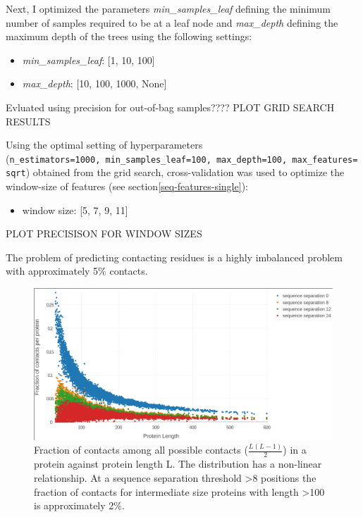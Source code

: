 \documentclass[12pt,a4paper,twoside]{book}
\providecommand{\tightlist}{%
  \setlength{\itemsep}{0pt}\setlength{\parskip}{0pt}}
\theoremstyle{definition}
\theoremstyle{definition}
\theoremstyle{remark}
\begin{document}
Next, I optimized the parameters \emph{min\_samples\_leaf} defining the
minimum number of samples required to be at a leaf node and
\emph{max\_depth} defining the maximum depth of the trees using the
following settings:

\begin{itemize}
\tightlist
\item
  \emph{min\_samples\_leaf}: {[}1, 10, 100{]}
\item
  \emph{max\_depth}: {[}10, 100, 1000, None{]}
\end{itemize}

Evluated using precision for out-of-bag samples???? PLOT GRID SEARCH
RESULTS

Using the optimal setting of hyperparameters
(\texttt{n\_estimators=1000,\ min\_samples\_leaf=100,\ max\_depth=100,\ max\_features=sqrt})
obtained from the grid search, cross-validation was used to optimize the
window-size of features (see section\ref{seq-features-single}):

\begin{itemize}
\tightlist
\item
  window size: {[}5, 7, 9, 11{]}
\end{itemize}

PLOT PRECISISON FOR WINDOW SIZES

The problem of predicting contacting residues is a highly imbalanced
problem with approximately 5\% contacts.








\begin{figure}

{\centering \includegraphics[width=0.8\linewidth]{img/random_forest_contact_prior/fraction_contacts_vs_protein_length_thr8} 

}

\caption{Fraction of contacts
among all possible contacts (\(\frac{L(L-1)}{2}\)) in a protein against
protein length L. The distribution has a non-linear relationship. At a
sequence separation threshold \textgreater{}8 positions the fraction of
contacts for intermediate size proteins with length \textgreater{}100 is
approximately 2\%.}\label{fig:fraction-contacts-vs-protein-length}
\end{figure}
\end{document}
